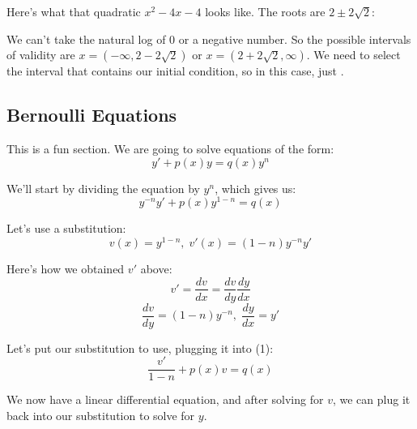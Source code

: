 \pagebreak

Here's what that quadratic $x^{2} - 4x - 4$ looks like. The roots are $2 \pm 2\sqrt{2}$:
\begin{center}
\end{center}

We can't take the natural log of 0 or a negative number. So the possible intervals of validity are $x = (-\infty, 2 - 2\sqrt{2})$ or $x = (2 + 2\sqrt{2}, \infty)$. We need to select the interval that contains our initial condition, so in this case, just .

\subsection{Bernoulli Equations}
This is a fun section. We are going to solve equations of the form:
$$y' + p(x)y = q(x)y^{n}$$

We'll start by dividing the equation by $y^{n}$, which gives us:
\begin{equation}
	y^{-n}y' + p(x)y^{1 - n} = q(x)
\end{equation}

Let's use a substitution:
$$v(x) = y^{1 - n},\;v'(x) = (1 - n)y^{-n}y'$$

Here's how we obtained $v'$ above:
$$v' = \frac{dv}{dx} = \frac{dv}{dy}\frac{dy}{dx}$$
$$\frac{dv}{dy} = (1 - n)y^{-n},\;\frac{dy}{dx} = y'$$

Let's put our substitution to use, plugging it into (1):
$$\frac{v'}{1 - n} + p(x)v = q(x)$$

We now have a linear differential equation, and after solving for $v$, we can plug it back into our substitution to solve for $y$.

\pagebreak

